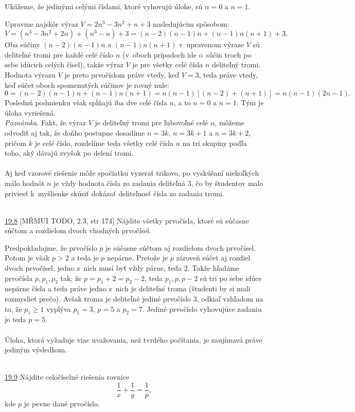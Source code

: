 \rieh Ukážeme, že jedinými celými číslami, ktoré vyhovujú úlohe, sú $n = 0$ a $n = 1$.

Upravme najskôr výraz $V = 2n^3 - 3n^2 + n + 3$ nasledujúcim spôsobom:
$$V = (n^3 - 3n^2+ 2n) + (n^3 - n) + 3 = (n - 2)(n - 1)n + (n - 1)n(n + 1) + 3.$$
Oba súčiny $(n-2)(n-1)n$ a $(n-1)n(n+1)$ v~upravenom výraze $V$ sú deliteľné tromi pre každé celé číslo $n$ (v~oboch prípadoch ide o~súčin troch po sebe idúcich celých čísel), takže výraz $V$ je pre všetky celé čísla $n$ deliteľný tromi. Hodnota výrazu $V$ je preto prvočíslom práve vtedy, keď $V = 3$, teda práve vtedy, keď súčet oboch spomenutých súčinov je rovný nule:
$$0 = (n - 2)(n - 1)n + (n - 1)n(n + 1) = n(n - 1)[(n - 2) + (n + 1)] = n(n - 1)(2n - 1).$$
Poslednú podmienku však spĺňajú iba dve celé čísla $n$, a to $n = 0$ a $n = 1$. Tým je úloha vyriešená.\\
\textit{Poznámka}. Fakt, že výraz $V$ je deliteľný tromi pre ľubovoľné celé $n$, môžeme odvodiť aj tak, že doňho postupne dosadíme $n = 3k$, $n = 3k + 1$ a $n = 3k + 2$, pričom $k$ je celé číslo, rozdelíme teda všetky celé čísla $n$ na tri skupiny podľa toho, aký dávajú zvyšok po delení tromi.\\
\\
\kom Aj keď vzorové riešenie môže spočiatku vyzerať trikovo, po vyskúšaní niekoľkých málo hodnôt $n$ je vždy hodnota čísla zo zadania deliteľná 3, čo by študentov malo priviesť k~myšlienke skúsiť dokázať deliteľnosť čísla zo zadania tromi.\\
\\
\begin{tcolorbox}[breakable,notitle,boxrule=0pt,colback=light-gray,colframe=light-gray]\ul{19.8} [MŘMUI TODO, 2.3, str 174] Nájdite všetky prvočísla, ktoré sú súčasne súčtom a rozdielom dvoch vhodných prvočísel.

\end{tcolorbox}

\rieh Predpokladajme, že prvočíslo $p$ je súčasne súčtom aj rozdielom dvoch prvočísel. Potom je však $p>2$ a teda je $p$ nepárne. Pretože je $p$ zároveň súčet aj rozdiel dvoch prvočísel, jedno z~nich musí byť vždy párne, teda 2. Takže hľadáme prvočísla $p, p_1, p_2$ tak, že $p=p_1+2=p_2-2$, teda $p_1, p, p-2$ sú tri po sebe idúce nepárne čísla a teda práve jedno z~nich je deliteľné troma (študenti by si mali rozmyslieť prečo). Avšak troma je deliteľné jediné prvočíslo 3, odkiaľ vzhľadom na to, že $p_1\geq 1$ vyplýva $p_1=3$, $p=5$ a $p_2=7$. Jediné prvočíslo vyhovujúce zadaniu je teda $p=5$.\\
\\
\kom Úloha, ktorá vyžaduje viac uvažovania, než tvrdého počítania, je zaujímavá práve jediným výsledkom.\\
\\
\begin{tcolorbox}[breakable,notitle,boxrule=0pt,colback=light-gray,colframe=light-gray]\ul{19.9} \cite[str. 95]{thiele1986} Nájdite celočíselné riešenia rovnice $$\frac{1}{x}+\frac{1}{y}=\frac{1}{p},$$ kde $p$ je pevne dané prvočíslo.

\end{tcolorbox}


